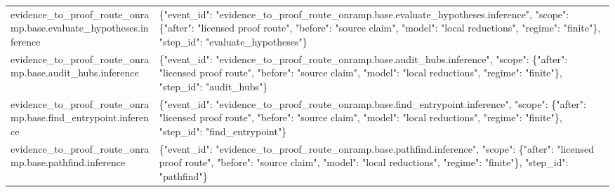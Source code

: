 \documentclass[10pt,a4paper]{article}
\begin{document}
\begin{longtable}{@{}>{\raggedright\arraybackslash}p{.20\linewidth}>{\raggedright\arraybackslash}p{.67\linewidth}@{}}
\hypertarget{trace-scope-2ea29b3b6d960d8079}{evidence\_\allowbreak{}to\_\allowbreak{}proof\_\allowbreak{}route\_\allowbreak{}onramp.\allowbreak{}base.\allowbreak{}evaluate\_\allowbreak{}hypotheses\allowbreak{}.\allowbreak{}inference} & \{"event\_\allowbreak{}id":\allowbreak{} "evidence\_\allowbreak{}to\_\allowbreak{}proof\_\allowbreak{}route\_\allowbreak{}onramp.\allowbreak{}base.\allowbreak{}evaluate\_\allowbreak{}hypotheses\allowbreak{}.\allowbreak{}inference"\allowbreak{}, "scope":\allowbreak{} \{"after":\allowbreak{} "licensed proof route", "before":\allowbreak{} "source claim", "model":\allowbreak{} "local reductions\allowbreak{}", "regime":\allowbreak{} "finite"\},\allowbreak{} "step\_\allowbreak{}id":\allowbreak{} "evaluate\_\allowbreak{}hypotheses\allowbreak{}"\}\\
\hypertarget{trace-scope-9c39968b758bfe55a4}{evidence\_\allowbreak{}to\_\allowbreak{}proof\_\allowbreak{}route\_\allowbreak{}onramp.\allowbreak{}base.\allowbreak{}audit\_\allowbreak{}hubs.\allowbreak{}inference} & \{"event\_\allowbreak{}id":\allowbreak{} "evidence\_\allowbreak{}to\_\allowbreak{}proof\_\allowbreak{}route\_\allowbreak{}onramp.\allowbreak{}base.\allowbreak{}audit\_\allowbreak{}hubs.\allowbreak{}inference"\allowbreak{}, "scope":\allowbreak{} \{"after":\allowbreak{} "licensed proof route", "before":\allowbreak{} "source claim", "model":\allowbreak{} "local reductions\allowbreak{}", "regime":\allowbreak{} "finite"\},\allowbreak{} "step\_\allowbreak{}id":\allowbreak{} "audit\_\allowbreak{}hubs"\}\\
\hypertarget{trace-scope-dc51f888c55bcaf60b}{evidence\_\allowbreak{}to\_\allowbreak{}proof\_\allowbreak{}route\_\allowbreak{}onramp.\allowbreak{}base.\allowbreak{}find\_\allowbreak{}entrypoint\allowbreak{}.\allowbreak{}inference} & \{"event\_\allowbreak{}id":\allowbreak{} "evidence\_\allowbreak{}to\_\allowbreak{}proof\_\allowbreak{}route\_\allowbreak{}onramp.\allowbreak{}base.\allowbreak{}find\_\allowbreak{}entrypoint\allowbreak{}.\allowbreak{}inference"\allowbreak{}, "scope":\allowbreak{} \{"after":\allowbreak{} "licensed proof route", "before":\allowbreak{} "source claim", "model":\allowbreak{} "local reductions\allowbreak{}", "regime":\allowbreak{} "finite"\},\allowbreak{} "step\_\allowbreak{}id":\allowbreak{} "find\_\allowbreak{}entrypoint\allowbreak{}"\}\\
\hypertarget{trace-scope-07f0d8c63b138a9fc4}{evidence\_\allowbreak{}to\_\allowbreak{}proof\_\allowbreak{}route\_\allowbreak{}onramp.\allowbreak{}base.\allowbreak{}pathfind.\allowbreak{}inference} & \{"event\_\allowbreak{}id":\allowbreak{} "evidence\_\allowbreak{}to\_\allowbreak{}proof\_\allowbreak{}route\_\allowbreak{}onramp.\allowbreak{}base.\allowbreak{}pathfind.\allowbreak{}inference"\allowbreak{}, "scope":\allowbreak{} \{"after":\allowbreak{} "licensed proof route", "before":\allowbreak{} "source claim", "model":\allowbreak{} "local reductions\allowbreak{}", "regime":\allowbreak{} "finite"\},\allowbreak{} "step\_\allowbreak{}id":\allowbreak{} "pathfind"\allowbreak{}\}\\

\end{longtable}
\end{document}

